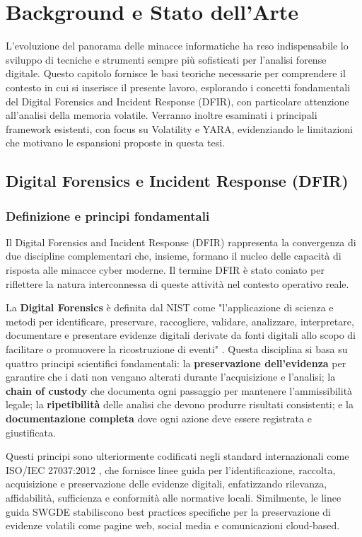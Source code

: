 \chapter{Background e Stato dell'Arte}

L'evoluzione del panorama delle minacce informatiche ha reso indispensabile lo sviluppo di tecniche e strumenti sempre più sofisticati per l'analisi forense digitale. Questo capitolo fornisce le basi teoriche necessarie per comprendere il contesto in cui si inserisce il presente lavoro, esplorando i concetti fondamentali del Digital Forensics and Incident Response (DFIR), con particolare attenzione all'analisi della memoria volatile. Verranno inoltre esaminati i principali framework esistenti, con focus su Volatility e YARA, evidenziando le limitazioni che motivano le espansioni proposte in questa tesi.

\section{Digital Forensics e Incident Response (DFIR)}

\subsection{Definizione e principi fondamentali}

Il Digital Forensics and Incident Response (DFIR) rappresenta la convergenza di due discipline complementari che, insieme, formano il nucleo delle capacità di risposta alle minacce cyber moderne. Il termine DFIR è stato coniato per riflettere la natura interconnessa di queste attività nel contesto operativo reale.

La \textbf{Digital Forensics} è definita dal NIST come "l'applicazione di scienza e metodi per identificare, preservare, raccogliere, validare, analizzare, interpretare, documentare e presentare evidenze digitali derivate da fonti digitali allo scopo di facilitare o promuovere la ricostruzione di eventi" \cite{kent2006}. Questa disciplina si basa su quattro principi scientifici fondamentali: la \textbf{preservazione dell'evidenza} per garantire che i dati non vengano alterati durante l'acquisizione e l'analisi; la \textbf{chain of custody} che documenta ogni passaggio per mantenere l'ammissibilità legale; la \textbf{ripetibilità} delle analisi che devono produrre risultati consistenti; e la \textbf{documentazione completa} dove ogni azione deve essere registrata e giustificata.

Questi principi sono ulteriormente codificati negli standard internazionali come ISO/IEC 27037:2012 \cite{iso27037}, che fornisce linee guida per l'identificazione, raccolta, acquisizione e preservazione delle evidenze digitali, enfatizzando rilevanza, affidabilità, sufficienza e conformità alle normative locali. Similmente, le linee guida SWGDE \cite{swgde2022} stabiliscono best practices specifiche per la preservazione di evidenze volatili come pagine web, social media e comunicazioni cloud-based.

